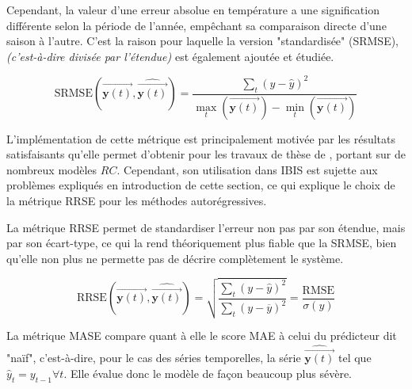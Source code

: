             Cependant, la valeur d'une erreur absolue en température a une signification différente selon la période de l'année, empêchant sa comparaison directe d'une saison à l'autre.
            C'est la raison pour laquelle la version "standardisée" (SRMSE), \textit{(c'est-à-dire divisée par l'étendue)} est également ajoutée et étudiée.

            \begin{equation}
                \mathrm{SRMSE}\left(\overrightarrow {\mathbf y(t)}, \widehat{\overrightarrow{\mathbf y(t)}}\right) = \frac{\sum_t \left(y -\hat y\right)^2}{\max_t{\left(\overrightarrow {\mathbf y\left(t \right)}\right)}-\min_t\left( \overrightarrow {\mathbf y(t) }\right)}\label{eq:SRMSE}
            \end{equation}

            \begin{bluebox}
                L'implémentation de cette métrique est principalement motivée par les résultats satisfaisants qu'elle permet d'obtenir pour les travaux de thèse de \cite{scanu}, portant sur de nombreux modèles $RC$.
                Cependant, son utilisation dans IBIS est sujette aux problèmes expliqués en introduction de cette section, ce qui explique le choix de la métrique RRSE pour les méthodes autorégressives.
            \end{bluebox}

            La métrique RRSE permet de standardiser l'erreur non pas par son étendue, mais par son écart-type, ce qui la rend théoriquement plus fiable que la SRMSE\@, bien qu'elle non plus ne permette pas de décrire complètement le système.

            \begin{equation}
                \mathrm{RRSE}\left(\overrightarrow {\mathbf y(t)}, \widehat{\overrightarrow{\mathbf y(t)}}\right) = \sqrt{\frac{\sum_t \left(y -\hat y\right)^2}{\sum_t \left(y -\overline y\right)^2}} = \frac{\mathrm{RMSE}}{\sigma\left(y\right)}\label{eq:RRSE}
            \end{equation}

            La métrique MASE compare quant à elle le score MAE à celui du prédicteur dit "naïf", c'est-à-dire, pour le cas des séries temporelles, la série $\widehat{\overrightarrow{\mathbf y(t)}}$ tel que $\hat y_t = y_{t-1} \forall t$.
            Elle évalue donc le modèle de façon beaucoup plus sévère.

